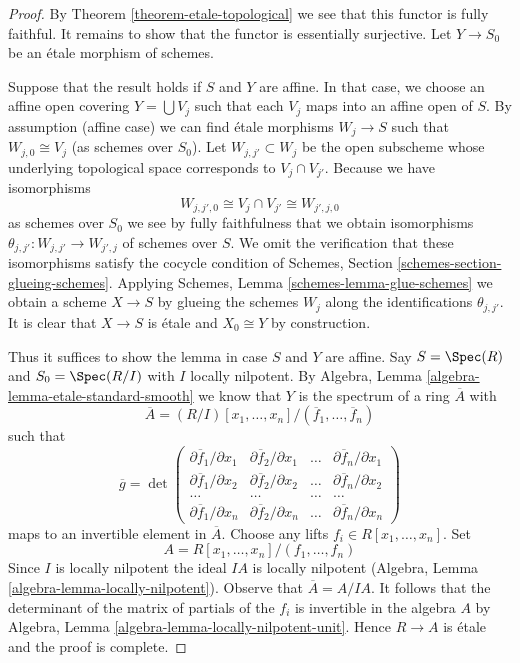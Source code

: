 \begin{proof}
By Theorem \ref{theorem-etale-topological}
we see that this functor is fully faithful.
It remains to show that the functor is essentially surjective.
Let $Y \to S_0$ be an \'etale morphism of schemes.

\medskip\noindent
Suppose that the result holds if $S$ and $Y$ are affine.
In that case, we choose an affine open covering
$Y = \bigcup V_j$ such that each $V_j$ maps
into an affine open of $S$. By assumption (affine case) we can
find \'etale morphisms $W_j \to S$ such that $W_{j, 0} \cong V_j$
(as schemes over $S_0$). Let $W_{j, j'} \subset W_j$
be the open subscheme whose underlying topological space
corresponds to $V_j \cap V_{j'}$. Because we have isomorphisms
$$
W_{j, j', 0} \cong V_j \cap V_{j'} \cong W_{j', j, 0}
$$
as schemes over $S_0$ we see by fully faithfulness that we
obtain isomorphisms
$\theta_{j, j'} : W_{j, j'} \to W_{j', j}$ of schemes over $S$.
We omit the verification that these isomorphisms satisfy the
cocycle condition of Schemes, Section \ref{schemes-section-glueing-schemes}.
Applying Schemes, Lemma \ref{schemes-lemma-glue-schemes}
we obtain a scheme $X \to S$ by
glueing the schemes $W_j$ along the identifications $\theta_{j, j'}$.
It is clear that $X \to S$ is \'etale and $X_0 \cong Y$ by construction.

\medskip\noindent
Thus it suffices to show the lemma in case $S$ and $Y$ are affine.
Say $S = \Spec(R)$ and $S_0 = \Spec(R/I)$ with $I$ locally nilpotent.
By Algebra, Lemma \ref{algebra-lemma-etale-standard-smooth} we know that
$Y$ is the spectrum of a ring $\overline{A}$ with
$$
\overline{A} = (R/I)[x_1, \ldots, x_n]/(\overline{f}_1, \ldots, \overline{f}_n)
$$
such that
$$
\overline{g} =
\det
\left(
\begin{matrix}
\partial \overline{f}_1/\partial x_1 &
\partial \overline{f}_2/\partial x_1 &
\ldots &
\partial \overline{f}_n/\partial x_1 \\
\partial \overline{f}_1/\partial x_2 &
\partial \overline{f}_2/\partial x_2 &
\ldots &
\partial \overline{f}_n/\partial x_2 \\
\ldots & \ldots & \ldots & \ldots \\
\partial \overline{f}_1/\partial x_n &
\partial \overline{f}_2/\partial x_n &
\ldots &
\partial \overline{f}_n/\partial x_n
\end{matrix}
\right)
$$
maps to an invertible element in $\overline{A}$. Choose any lifts
$f_i \in R[x_1, \ldots, x_n]$. Set
$$
A = R[x_1, \ldots, x_n]/(f_1, \ldots, f_n)
$$
Since $I$ is locally nilpotent the ideal $IA$ is locally nilpotent
(Algebra, Lemma \ref{algebra-lemma-locally-nilpotent}).
Observe that $\overline{A} = A/IA$.
It follows that the determinant of the matrix of partials of the
$f_i$ is invertible in the algebra $A$ by
Algebra, Lemma \ref{algebra-lemma-locally-nilpotent-unit}.
Hence $R \to A$ is \'etale and the proof is complete.
\end{proof}




